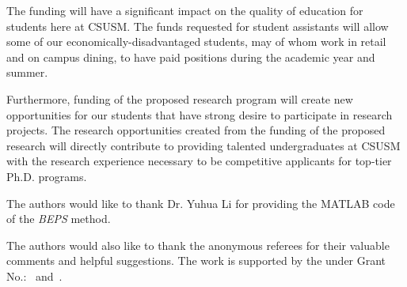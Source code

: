 The funding will have a significant impact on the quality of education for students here at CSUSM. The funds requested for student assistants will allow some of our economically-disadvantaged students, may of whom work in retail and on campus dining, to have paid positions during the academic year and summer.

Furthermore, funding of the proposed research program will create new opportunities for our students that have strong desire to participate in research projects. The research opportunities created from the funding of the proposed research will directly contribute to providing talented undergraduates at CSUSM with the research experience necessary to be competitive applicants for top-tier Ph.D. programs.

\begin{acks}
  The authors would like to thank Dr. Yuhua Li for providing the
  MATLAB code of the \textit{BEPS} method.

  The authors would also like to thank the anonymous referees for
  their valuable comments and helpful suggestions. The work is
  supported by the  under Grant
  No.:~
  and~.

\end{acks}

